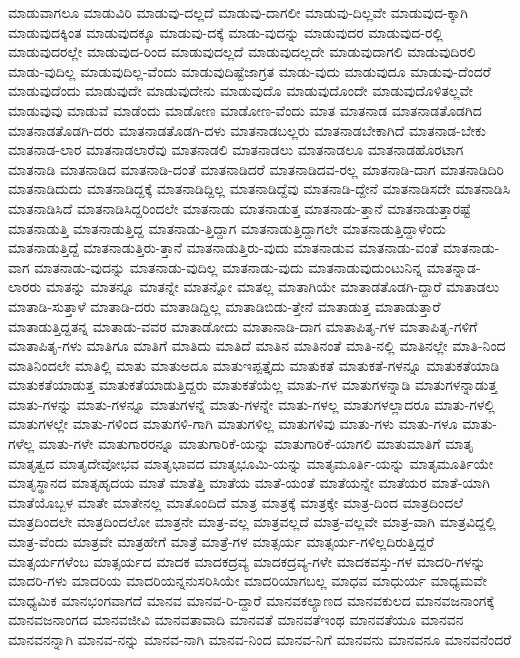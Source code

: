{ಮಾಡುವಾಗಲೂ
ಮಾಡುವಿರಿ
ಮಾಡುವು-ದಲ್ಲದೆ
ಮಾಡುವು-ದಾಗಲೀ
ಮಾಡುವು-ದಿಲ್ಲವೇ
ಮಾಡುವುದ-ಕ್ಕಾಗಿ
ಮಾಡುವುದಕ್ಕಿಂತ
ಮಾಡುವುದಕ್ಕೂ
ಮಾಡುವು-ದಕ್ಕೆ
ಮಾಡು-ವುದನ್ನು
ಮಾಡುವುದರ
ಮಾಡುವುದ-ರಲ್ಲಿ
ಮಾಡುವುದರಲ್ಲೇ
ಮಾಡುವುದ-ರಿಂದ
ಮಾಡುವುದಲ್ಲದೆ
ಮಾಡುವುದಲ್ಲದೇ
ಮಾಡುವುದಾಗಲಿ
ಮಾಡುವುದಿರಲಿ
ಮಾಡು-ವುದಿಲ್ಲ
ಮಾಡುವುದಿಲ್ಲ-ವೆಂದು
ಮಾಡುವುದಿಷ್ಟೆಜಾಗ್ರತ
ಮಾಡು-ವುದು
ಮಾಡುವುದೂ
ಮಾಡುವು-ದೆಂದರೆ
ಮಾಡುವುದೆಂದು
ಮಾಡುವುದೇ
ಮಾಡುವುದೇನು
ಮಾಡುವುದೊ
ಮಾಡುವುದೊಂದೇ
ಮಾಡುವುದೊಳಿತಲ್ಲವೇ
ಮಾಡುವುವು
ಮಾಡುವೆ
ಮಾಡೆಂದು
ಮಾಡೋಣ
ಮಾಡೋಣ-ವೆಂದು
ಮಾತ
ಮಾತನಾಡ
ಮಾತನಾಡತೊಡಗಿದ
ಮಾತನಾಡತೊಡಗಿ-ದರು
ಮಾತನಾಡತೊಡಗಿ-ದಳು
ಮಾತನಾಡಬಲ್ಲರು
ಮಾತನಾಡಬೇಕಾಗಿದೆ
ಮಾತನಾಡ-ಬೇಕು
ಮಾತನಾಡ-ಲಾರ
ಮಾತನಾಡಲಾರೆವು
ಮಾತನಾಡಲಿ
ಮಾತನಾಡಲು
ಮಾತನಾಡಲೂ
ಮಾತನಾಡಹೊರಟಾಗ
ಮಾತನಾಡಿ
ಮಾತನಾಡಿದ
ಮಾತನಾಡಿ-ದಂತೆ
ಮಾತನಾಡಿದರೆ
ಮಾತನಾಡಿದವ-ರಲ್ಲ
ಮಾತನಾಡಿ-ದಾಗ
ಮಾತನಾಡಿದಿರಿ
ಮಾತನಾಡಿದುದು
ಮಾತನಾಡಿದ್ದಕ್ಕೆ
ಮಾತನಾಡಿದ್ದಿಲ್ಲ
ಮಾತನಾಡಿದ್ದೆವು
ಮಾತನಾಡಿ-ದ್ದೇನೆ
ಮಾತನಾಡಿಸದೇ
ಮಾತನಾಡಿಸಿ
ಮಾತನಾಡಿಸಿದೆ
ಮಾತನಾಡಿಸಿದ್ದರಿಂದಲೇ
ಮಾತನಾಡು
ಮಾತನಾಡುತ್ತ
ಮಾತನಾಡು-ತ್ತಾನೆ
ಮಾತನಾಡುತ್ತಾರಷ್ಟೆ
ಮಾತನಾಡುತ್ತಿ
ಮಾತನಾಡುತ್ತಿದ್ದ
ಮಾತನಾಡು-ತ್ತಿದ್ದಾಗ
ಮಾತನಾಡುತ್ತಿದ್ದಾಗಲೇ
ಮಾತನಾಡುತ್ತಿದ್ದಾಳೆಂದು
ಮಾತನಾಡುತ್ತಿದ್ದೆ
ಮಾತನಾಡುತ್ತಿರು-ತ್ತಾನೆ
ಮಾತನಾಡುತ್ತಿರು-ವುದು
ಮಾತನಾಡುವ
ಮಾತನಾಡು-ವಂತೆ
ಮಾತನಾಡು-ವಾಗ
ಮಾತನಾಡು-ವುದನ್ನು
ಮಾತನಾಡು-ವುದಿಲ್ಲ
ಮಾತನಾಡು-ವುದು
ಮಾತನಾಡುವುದುಂಟುನಿನ್ನ
ಮಾತನ್ನಾಡ-ಲಾರರು
ಮಾತನ್ನು
ಮಾತನ್ನೂ
ಮಾತನ್ನೇ
ಮಾತನ್ನೋ
ಮಾತಲ್ಲ
ಮಾತಾಗಿಯೇ
ಮಾತಾಡತೊಡಗಿ-ದ್ದಾರೆ
ಮಾತಾಡಲು
ಮಾತಾಡಿ-ಸುತ್ತಾಳೆ
ಮಾತಾಡಿ-ದರು
ಮಾತಾಡಿದ್ದಿಲ್ಲ
ಮಾತಾಡಿಬಿಡು-ತ್ತೇನೆ
ಮಾತಾಡುತ್ತ
ಮಾತಾಡುತ್ತಾರೆ
ಮಾತಾಡುತ್ತಿದ್ದತನ್ನ
ಮಾತಾಡು-ವವರ
ಮಾತಾಡೋದು
ಮಾತಾನಾಡಿ-ದಾಗ
ಮಾತಾಪಿತೃ-ಗಳ
ಮಾತಾಪಿತೃ-ಗಳಿಗೆ
ಮಾತಾಪಿತೃ-ಗಳು
ಮಾತಿಗೂ
ಮಾತಿಗೆ
ಮಾತಿದು
ಮಾತಿದೆ
ಮಾತಿನ
ಮಾತಿನಂತೆ
ಮಾತಿ-ನಲ್ಲಿ
ಮಾತಿನಲ್ಲೇ
ಮಾತಿ-ನಿಂದ
ಮಾತಿನಿಂದಲೇ
ಮಾತಿಲ್ಲಿ
ಮಾತು
ಮಾತುಅದೂ
ಮಾತುಇಪ್ಪತ್ತೈದು
ಮಾತುಕತೆ
ಮಾತುಕತೆ-ಗಳನ್ನೂ
ಮಾತುಕತೆಯಾಡಿ
ಮಾತುಕತೆಯಾಡುತ್ತ
ಮಾತುಕತೆಯಾಡುತ್ತಿದ್ದರು
ಮಾತುಕತೆಯೆಲ್ಲ
ಮಾತು-ಗಳ
ಮಾತುಗಳನ್ನಾಡಿ
ಮಾತುಗಳನ್ನಾಡುತ್ತ
ಮಾತು-ಗಳನ್ನು
ಮಾತು-ಗಳನ್ನೂ
ಮಾತುಗಳನ್ನೆ
ಮಾತು-ಗಳನ್ನೇ
ಮಾತು-ಗಳಲ್ಲ
ಮಾತುಗಳಲ್ಲಾದರೂ
ಮಾತು-ಗಳಲ್ಲಿ
ಮಾತುಗಳಲ್ಲೇ
ಮಾತು-ಗಳಿಂದ
ಮಾತುಗಳಿ-ಗಾಗಿ
ಮಾತುಗಳಿಲ್ಲ
ಮಾತುಗಳಿವು
ಮಾತು-ಗಳು
ಮಾತು-ಗಳೂ
ಮಾತು-ಗಳೆಲ್ಲ
ಮಾತು-ಗಳೇ
ಮಾತುಗಾರರನ್ನೂ
ಮಾತುಗಾರಿಕೆ-ಯನ್ನು
ಮಾತುಗಾರಿಕೆ-ಯಾಗಲಿ
ಮಾತುಮಾತಿಗೆ
ಮಾತೃ
ಮಾತೃತ್ವದ
ಮಾತೃದೇವೋಭವ
ಮಾತೃಭಾವದ
ಮಾತೃಭೂಮಿ-ಯನ್ನು
ಮಾತೃಮೂರ್ತಿ-ಯನ್ನು
ಮಾತೃಮೂರ್ತಿಯೇ
ಮಾತೃಸ್ಥಾನದ
ಮಾತೃಹೃದಯ
ಮಾತೆ
ಮಾತೆತ್ತಿ
ಮಾತೆಯ
ಮಾತೆ-ಯಂತೆ
ಮಾತೆಯನ್ನೇ
ಮಾತೆಯರ
ಮಾತೆ-ಯಾಗಿ
ಮಾತೆಯೊಬ್ಬಳ
ಮಾತೇ
ಮಾತೇನಲ್ಲ
ಮಾತೊಂದಿದೆ
ಮಾತ್ರ
ಮಾತ್ರಕ್ಕೆ
ಮಾತ್ರಕ್ಕೇ
ಮಾತ್ರ-ದಿಂದ
ಮಾತ್ರದಿಂದಲೆ
ಮಾತ್ರದಿಂದಲೇ
ಮಾತ್ರದಿಂದಲೋ
ಮಾತ್ರನೇ
ಮಾತ್ರ-ವಲ್ಲ
ಮಾತ್ರವಲ್ಲದೆ
ಮಾತ್ರ-ವಲ್ಲವೇ
ಮಾತ್ರ-ವಾಗಿ
ಮಾತ್ರವಿದ್ದಲ್ಲಿ
ಮಾತ್ರ-ವೆಂದು
ಮಾತ್ರವೇ
ಮಾತ್ರಹೇಗೆ
ಮಾತ್ರೆ
ಮಾತ್ರೆ-ಗಳ
ಮಾತ್ಸರ್ಯ
ಮಾತ್ಸರ್ಯ-ಗಳಿಲ್ಲದಿರುತ್ತಿದ್ದರೆ
ಮಾತ್ಸರ್ಯಗಳೆಂಬ
ಮಾತ್ಸರ್ಯದ
ಮಾದಕ
ಮಾದಕದ್ರವ್ಯ
ಮಾದಕದ್ರವ್ಯ-ಗಳೇ
ಮಾದಕವಸ್ತು-ಗಳ
ಮಾದರಿ-ಗಳನ್ನು
ಮಾದರಿ-ಗಳು
ಮಾದರಿಯ
ಮಾದರಿಯನ್ನನುಸರಿಸಿಯೇ
ಮಾದರಿಯಾಗಬಲ್ಲ
ಮಾಧವ
ಮಾಧುರ್ಯ
ಮಾಧ್ಯಮವೇ
ಮಾಧ್ಯಮಿಕ
ಮಾನಭಂಗವಾಗದೆ
ಮಾನವ
ಮಾನವ-ರಿ-ದ್ದಾರೆ
ಮಾನವಕಲ್ಯಾಣದ
ಮಾನವಕುಲದ
ಮಾನವಜನಾಂಗಕ್ಕೆ
ಮಾನವಜನಾಂಗದ
ಮಾನವಜೀವಿ
ಮಾನವತಾವಾದಿ
ಮಾನವತೆ
ಮಾನವತೆಇಂಥ
ಮಾನವತೆಯೂ
ಮಾನವನ
ಮಾನವನನ್ನಾಗಿ
ಮಾನವ-ನನ್ನು
ಮಾನವ-ನಾಗಿ
ಮಾನವ-ನಿಂದ
ಮಾನವ-ನಿಗೆ
ಮಾನವನು
ಮಾನವನೂ
ಮಾನವನೆಂದರೆ
}
